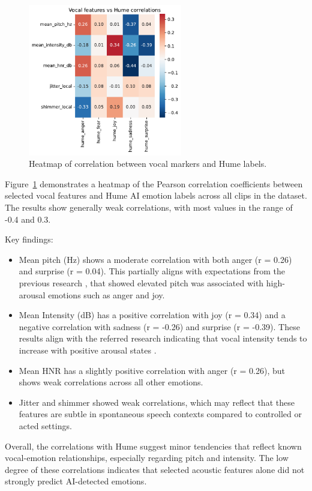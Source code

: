 \begin{figure}[H]
    \centering
    \includegraphics[width=0.6\textwidth]{png/results/rq1/vocal_features_vs_hume_correlations.pdf}
    \caption{Heatmap of correlation between vocal markers and Hume labels.}
    \label{fig:heatmap-voc-hume}
\end{figure}

Figure~\ref{fig:heatmap-voc-hume} demonstrates a heatmap of the Pearson correlation coefficients between selected vocal features and Hume AI emotion labels across all clips in the dataset. The results show generally weak correlations, with most values in the range of -0.4 and 0.3. 

\medskip
Key findings: 
\begin{itemize}
    \item Mean pitch (Hz) shows a moderate correlation with both anger (r = 0.26) and surprise (r = 0.04). This partially aligns with expectations from the previous research \autocite{Ekberg2023}, that showed elevated pitch was associated with high-arousal emotions such as anger and joy. 
    \item Mean Intensity (dB) has a positive correlation with joy (r = 0.34) and a negative correlation with sadness (r = -0.26) and surprise (r = -0.39). These results align with the referred research indicating that vocal intensity tends to increase with positive arousal states \autocite{Ekberg2023}. 
    \item Mean HNR has a slightly positive correlation with anger (r = 0.26), but shows weak correlations across all other emotions.
    \item Jitter and shimmer showed weak correlations, which may reflect that these features are subtle in spontaneous speech contexts compared to controlled or acted settings.  
\end{itemize}
Overall, the correlations with Hume suggest minor tendencies that reflect known vocal-emotion relationships, especially regarding pitch and intensity. The low degree of these correlations indicates that selected acoustic features alone did not strongly predict AI-detected emotions. 

